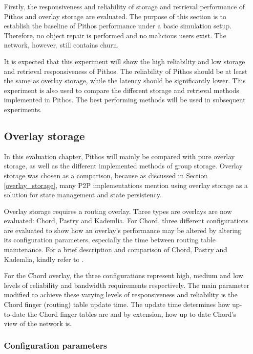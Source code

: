 Firstly, the responsiveness and reliability of storage and retrieval performance of Pithos and overlay storage are evaluated. The purpose of this section is to establish the baseline of Pithos performance under a basic simulation setup. Therefore, no object repair is performed and no malicious users exist. The network, however, still contains churn.

It is expected that this experiment will show the high reliability and low storage and retrieval responsiveness of Pithos. The reliability of Pithos should be at least the same as overlay storage, while the latency should be significantly lower. This experiment is also used to compare the different storage and retrieval methods implemented in Pithos. The best performing methods will be used in subsequent experiments.

\subsection{Overlay storage}
\label{overlay_results}

In this evaluation chapter, Pithos will mainly be compared with pure overlay storage, as well as the different implemented methods of group storage. Overlay storage was chosen as a comparison, because as discussed in Section \ref{overlay_storage}, many P2P implementations mention using overlay storage as a solution for state management and state persistency.

Overlay storage requires a routing overlay. Three types are overlays are now evaluated: Chord, Pastry and Kademlia. For Chord, three different configurations are evaluated to show how an overlay's performance may be altered by altering its configuration parameters, especially the time between routing table maintenance. For a brief description and comparison of Chord, Pastry and Kademlia, kindly refer to \cite{overlay_survey}.

For the Chord overlay, the three configurations represent high, medium and low levels of reliability and bandwidth requirements respectively. The main parameter modified to achieve these varying levels of responsiveness and reliability is the Chord finger (routing) table update time. The update time determines how up-to-date the Chord finger tables are and by extension, how up to date Chord's view of the network is.

\subsubsection{Configuration parameters}

